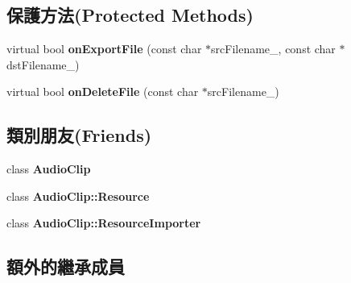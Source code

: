\subsection*{保護方法(Protected Methods)}
\begin{DoxyCompactItemize}
\item 
virtual bool {\bfseries on\+Export\+File} (const char $\ast$src\+Filename\+\_\+, const char $\ast$dst\+Filename\+\_\+)\hypertarget{class_magnum_1_1_audio_clip_1_1_resource_importer_a13cba4813852bd11ae907d03a03c6d5a}{}\label{class_magnum_1_1_audio_clip_1_1_resource_importer_a13cba4813852bd11ae907d03a03c6d5a}

\item 
virtual bool {\bfseries on\+Delete\+File} (const char $\ast$src\+Filename\+\_\+)\hypertarget{class_magnum_1_1_audio_clip_1_1_resource_importer_a500b7cd90ebee11a7d4a876a8ecc878f}{}\label{class_magnum_1_1_audio_clip_1_1_resource_importer_a500b7cd90ebee11a7d4a876a8ecc878f}

\end{DoxyCompactItemize}
\subsection*{類別朋友(Friends)}
\begin{DoxyCompactItemize}
\item 
class {\bfseries Audio\+Clip}\hypertarget{class_magnum_1_1_audio_clip_1_1_resource_importer_a9d56e3679258061c40e71e5321153525}{}\label{class_magnum_1_1_audio_clip_1_1_resource_importer_a9d56e3679258061c40e71e5321153525}

\item 
class {\bfseries Audio\+Clip\+::\+Resource}\hypertarget{class_magnum_1_1_audio_clip_1_1_resource_importer_aad8a33fb5708dac27c0354a31a2e386d}{}\label{class_magnum_1_1_audio_clip_1_1_resource_importer_aad8a33fb5708dac27c0354a31a2e386d}

\item 
class {\bfseries Audio\+Clip\+::\+Resource\+Importer}\hypertarget{class_magnum_1_1_audio_clip_1_1_resource_importer_a61e6e8f5b764bb025ab23de0a1f690d5}{}\label{class_magnum_1_1_audio_clip_1_1_resource_importer_a61e6e8f5b764bb025ab23de0a1f690d5}

\end{DoxyCompactItemize}
\subsection*{額外的繼承成員}


